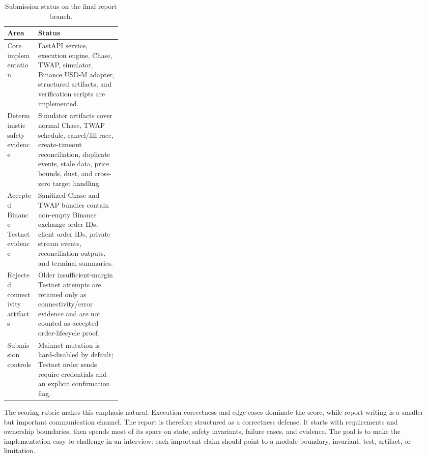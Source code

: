 \begin{table}[t]
\caption{Submission status on the final report branch.}
\label{tab:submission-status}
\centering
\small
\begin{tabularx}{\linewidth}{>{\raggedright\arraybackslash}p{0.27\linewidth} X}
\toprule
Area & Status \\
\midrule
Core implementation & FastAPI service, execution engine, Chase, TWAP, simulator, Binance USD-M adapter, structured artifacts, and verification scripts are implemented. \\
Deterministic safety evidence & Simulator artifacts cover normal Chase, TWAP schedule, cancel/fill race, create-timeout reconciliation, duplicate events, stale data, price bounds, dust, and cross-zero target handling. \\
Accepted Binance Testnet evidence & Sanitized Chase and TWAP bundles contain non-empty Binance exchange order IDs, client order IDs, private stream events, reconciliation outputs, and terminal summaries. \\
Rejected connectivity artifacts & Older insufficient-margin Testnet attempts are retained only as connectivity/error evidence and are not counted as accepted order-lifecycle proof. \\
Submission controls & Mainnet mutation is hard-disabled by default; Testnet order sends require credentials and an explicit confirmation flag. \\
\bottomrule
\end{tabularx}
\end{table}

The scoring rubric makes this emphasis natural. Execution correctness and edge cases dominate the score, while report writing is a smaller but important communication channel. The report is therefore structured as a correctness defense. It starts with requirements and ownership boundaries, then spends most of its space on state, safety invariants, failure cases, and evidence. The goal is to make the implementation easy to challenge in an interview: each important claim should point to a module boundary, invariant, test, artifact, or limitation.

